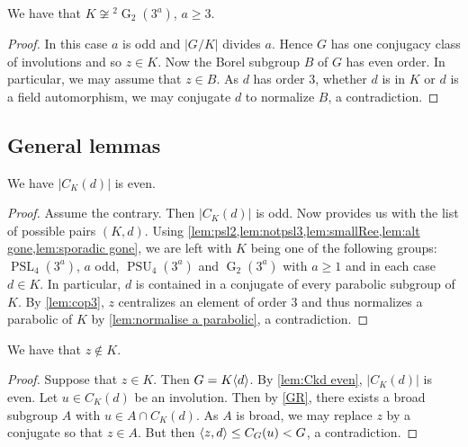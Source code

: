\documentclass[12pt,a4paper]{amsart}
\DeclareMathOperator{\G}{G}
\DeclareMathOperator{\PSL}{PSL}
\DeclareMathOperator{\PSU}{PSU}
\DeclarePairedDelimiter{\gen}{\langle}{\rangle}
\begin{document}
\begin{lemma}\label{lem:smallRee}
We have that $K \not \cong {}^2\G_2(3^a)$, $a \ge 3$.
\end{lemma}

\begin{proof}   In this case $a$ is odd and $|G/K|$ divides $a$. Hence $G$ has one conjugacy class of involutions and so $z \in K$.  Now the Borel subgroup  $B$ of $G$ has even order. In particular, we may assume that  $z\in B$. As $d$ has order $3$, whether $d$ is in $K$ or $d$ is a field automorphism, we may conjugate $d$ to normalize $B$, a contradiction.
\end{proof}








\subsection{General lemmas}\label{subsec:gen lemmas}



\begin{lemma}\label{lem:Ckd even} We have $|C_K(d)|$ is even.
\end{lemma}

\begin{proof} Assume the contrary. Then $|C_K(d)|$ is odd. Now  \cite[Theorem 3]{Gerhardt} provides us with the list of possible pairs $(K,d)$. Using \cref{lem:psl2,lem:notpsl3,lem:smallRee,lem:alt gone,lem:sporadic gone}, we are left with
$K$ being one of the following groups: $\PSL_4(3^a)$, $a$ odd, $\PSU_4(3^a)$ and  $\G_2(3^a)$ with $a \ge 1$ and in each case $d \in K$. In particular, $d$ is contained in a conjugate of every parabolic subgroup of $K$. By \cref{lem:cop3},   $z$ centralizes an element of order $3$ and thus normalizes a parabolic of $K$ by \cref{lem:normalise a parabolic},  a contradiction.
\end{proof}







\begin{lemma}\label{lem:z not in K} We have that  $z\not \in K$.
\end{lemma}

\begin{proof} Suppose that $z \in K$. Then $G= K\gen{d}$. By \cref{lem:Ckd even}, $|C_K(d)|$ is even. Let $u \in C_K(d)$ be an involution. Then by \cref{GR}, there exists a broad subgroup $A$ with $u \in A \cap C_K(d)$. As $A$ is broad, we may replace  $z$  by a conjugate so that  $z \in A$. But then $\gen{z,d} \le C_G(u)<G$, a contradiction.
\end{proof}
\end{document}
